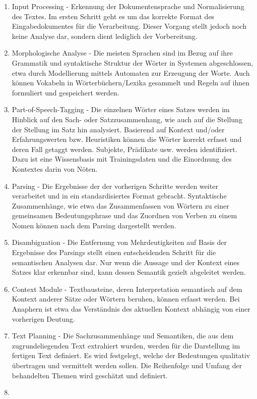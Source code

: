 \documentclass[12pt]{report}
\begin{document}
\begin{enumerate}
\item
Input Processing - Erkennung der Dokumentensprache und Normalisierung des Textes. Im ersten Schritt geht es um das korrekte Format des Eingabedokumentes für die Verarbeitung. Dieser Vorgang stellt jedoch noch keine Analyse dar, sondern dient lediglich der Vorbereitung.
\item
Morphologische Analyse - Die meisten Sprachen sind im Bezug auf ihre Grammatik und syntaktische Struktur der Wörter in Systemen abgeschlossen, etwa durch Modellierung mittels Automaten zur Erzeugung der Worte. Auch können Vokabeln in Wörterbüchern/Lexika gesammelt und Regeln auf ihnen formuliert und gespeichert werden.
\item
Part-of-Speech-Tagging - Die einzelnen Wörter eines Satzes werden im Hinblick auf den Sach- oder Satzzusammenhang, wie auch auf die Stellung der Stellung im Satz hin analysiert. Basierend auf Kontext und/oder Erfahrungswerten bzw. Heuristiken können die Wörter korrekt erfasst und deren Fall getaggt werden. Subjekte, Prädikate usw. werden identifiziert. Dazu ist eine Wissensbasis mit Trainingsdaten und die Einordnung des Kontextes darin von Nöten.
\item
Parsing - Die Ergebnisse der  der vorherigen Schritte werden weiter verarbeitet und in ein standardisiertes Format gebracht. Syntaktische Zusammenhänge, wie etwa das Zusammenfassen von Wörtern zu einer gemeinsamen Bedeutungsphrase und das Zuordnen von Verben zu einem Nomen können nach dem Parsing dargestellt werden.
\item
Disambiguation - Die Entfernung von Mehrdeutigkeiten auf Basis der Ergebnisse des Parsings stellt einen entscheidenden Schritt für die semantischen Analysen dar. Nur wenn die Aussage und der Kontext eines Satzes klar erkennbar sind, kann dessen Semantik gezielt abgeleitet werden.
\item
Context Module - Textbausteine, deren Interpretation semantisch auf dem Kontext anderer Sätze oder Wörtern beruhen, können erfasst werden. Bei Anaphern ist etwa das Verständnis des aktuellen Kontext abhängig von einer vorherigen Deutung.
\item
Text Planning - Die Sachzusammenhänge und Semantiken, die aus dem zugrundeliegenden Text extrahiert wurden, werden für die Darstellung im fertigen Text definiert. Es wird festgelegt, welche der Bedeutungen qualitativ übertragen und vermittelt werden sollen. Die Reihenfolge und Umfang der behandelten Themen wird geschätzt und definiert.
\item

\end{enumerate}
\end{document}
